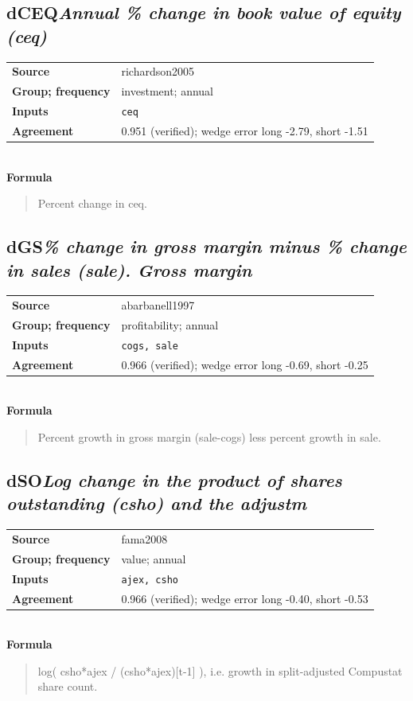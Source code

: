 \documentclass[11pt]{article}
\begin{document}
\subsection*{dCEQ\quad\normalfont\itshape Annual \% change in book value of equity (ceq)}
\begin{tabular}{@{}p{3.3cm}p{12.3cm}@{}}
\textbf{Source} & richardson2005\\
\textbf{Group; frequency} & investment; annual\\
\textbf{Inputs} & \texttt{ceq}\\
\textbf{Agreement} & 0.951 (verified); wedge error long -2.79, short -1.51\\
\end{tabular}\\[4pt]
\textbf{Formula}
\begin{quote}\small
Percent change in ceq.\\

\end{quote}
\subsection*{dGS\quad\normalfont\itshape \% change in gross margin minus \% change in sales (sale). Gross margin}
\begin{tabular}{@{}p{3.3cm}p{12.3cm}@{}}
\textbf{Source} & abarbanell1997\\
\textbf{Group; frequency} & profitability; annual\\
\textbf{Inputs} & \texttt{cogs, sale}\\
\textbf{Agreement} & 0.966 (verified); wedge error long -0.69, short -0.25\\
\end{tabular}\\[4pt]
\textbf{Formula}
\begin{quote}\small
Percent growth in gross margin (sale-cogs) less percent growth in sale.\\

\end{quote}
\subsection*{dSO\quad\normalfont\itshape Log change in the product of shares outstanding (csho) and the adjustm}
\begin{tabular}{@{}p{3.3cm}p{12.3cm}@{}}
\textbf{Source} & fama2008\\
\textbf{Group; frequency} & value; annual\\
\textbf{Inputs} & \texttt{ajex, csho}\\
\textbf{Agreement} & 0.966 (verified); wedge error long -0.40, short -0.53\\
\end{tabular}\\[4pt]
\textbf{Formula}
\begin{quote}\small
log( csho*ajex / (csho*ajex)[t-1] ), i.e. growth in split-adjusted Compustat\\
share count.\\

\end{quote}
\end{document}
